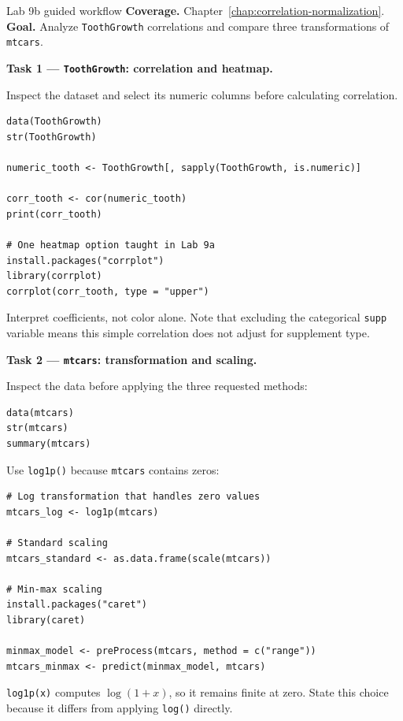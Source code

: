 
\begin{labproject}{Lab 9b guided workflow}
\textbf{Coverage.} Chapter~\ref{chap:correlation-normalization}.\\
\textbf{Goal.} Analyze \texttt{ToothGrowth} correlations and compare three transformations of \texttt{mtcars}.

\textbf{Task 1 --- \texttt{ToothGrowth}: correlation and heatmap.}

Inspect the dataset and select its numeric columns before calculating correlation.

\begin{lstlisting}[style=dsr]
data(ToothGrowth)
str(ToothGrowth)

numeric_tooth <- ToothGrowth[, sapply(ToothGrowth, is.numeric)]

corr_tooth <- cor(numeric_tooth)
print(corr_tooth)

# One heatmap option taught in Lab 9a
install.packages("corrplot")
library(corrplot)
corrplot(corr_tooth, type = "upper")
\end{lstlisting}

Interpret coefficients, not color alone. Note that excluding the categorical \texttt{supp} variable means this simple correlation does not adjust for supplement type.

\textbf{Task 2 --- \texttt{mtcars}: transformation and scaling.}

Inspect the data before applying the three requested methods:

\begin{lstlisting}[style=dsr]
data(mtcars)
str(mtcars)
summary(mtcars)
\end{lstlisting}

Use \texttt{log1p()} because \texttt{mtcars} contains zeros:

\begin{lstlisting}[style=dsr]
# Log transformation that handles zero values
mtcars_log <- log1p(mtcars)

# Standard scaling
mtcars_standard <- as.data.frame(scale(mtcars))

# Min-max scaling
install.packages("caret")
library(caret)

minmax_model <- preProcess(mtcars, method = c("range"))
mtcars_minmax <- predict(minmax_model, mtcars)
\end{lstlisting}

\begin{pitfall}
\texttt{log1p(x)} computes \(\log(1+x)\), so it remains finite at zero. State this choice because it differs from applying \texttt{log()} directly.
\end{pitfall}


\end{labproject}
